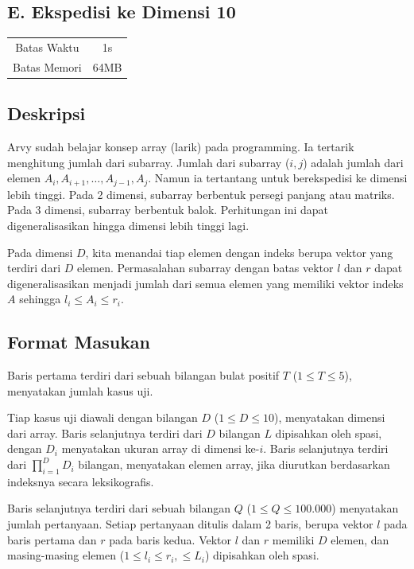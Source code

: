 \documentclass{article}
\begin{document}
\begin{center}
    \section*{E. Ekspedisi ke Dimensi 10} %

    \begin{tabular}{ | c c | }
        \hline
        Batas Waktu  & 1s \\    %
        Batas Memori & 64MB \\  %
        \hline
    \end{tabular}
\end{center}

\subsection*{Deskripsi}

Arvy sudah belajar konsep array (larik) pada programming.
Ia tertarik menghitung jumlah dari subarray.
Jumlah dari subarray ($i, j$) adalah jumlah dari elemen $A_i, A_{i+1}, \dots, A_{j-1}, A_j$.
Namun ia tertantang untuk berekspedisi ke dimensi lebih tinggi.
Pada 2 dimensi, subarray berbentuk persegi panjang atau matriks.
Pada 3 dimensi, subarray berbentuk balok.
Perhitungan ini dapat digeneralisasikan hingga dimensi lebih tinggi lagi.

Pada dimensi $D$, kita menandai tiap elemen dengan indeks berupa vektor yang terdiri dari $D$ elemen.
Permasalahan subarray dengan batas vektor $l$ dan $r$ dapat digeneralisasikan menjadi jumlah dari semua elemen yang memiliki vektor indeks $A$ sehingga $l_i \leq A_i \leq r_i$.

\subsection*{Format Masukan}

Baris pertama terdiri dari sebuah bilangan bulat positif $T$ ($1 \leq T \leq 5$), menyatakan jumlah kasus uji.

Tiap kasus uji diawali dengan bilangan $D$ ($1 \leq D \leq 10$), menyatakan dimensi dari array.
Baris selanjutnya terdiri dari $D$ bilangan $L$ dipisahkan oleh spasi, dengan $D_i$ menyatakan ukuran array di dimensi ke-$i$.
Baris selanjutnya terdiri dari $\prod_{i=1}^{D}{D_i}$ bilangan, menyatakan elemen array, jika diurutkan berdasarkan indeksnya secara leksikografis.

Baris selanjutnya terdiri dari sebuah bilangan $Q$ ($1 \leq Q \leq 100.000$) menyatakan jumlah pertanyaan.
Setiap pertanyaan ditulis dalam 2 baris, berupa vektor $l$ pada baris pertama dan $r$ pada baris kedua. Vektor $l$ dan $r$ memiliki $D$ elemen, dan masing-masing elemen ($1 \leq l_i \leq r_i, \leq L_i$) dipisahkan oleh spasi.
\end{document}
